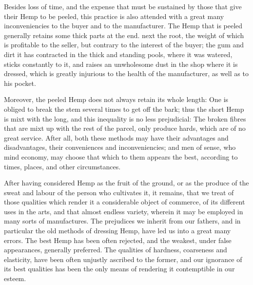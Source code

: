 \documentclass[a4paper, 11pt, oneside, polutonikogreek, english]{article}
\begin{document}
Besides loss of time, and the expense that must be sustained by those that give their Hemp to be peeled, this practice is also attended with a great many inconveniencies to the buyer and to the manufacturer. The Hemp that is peeled generally retains some thick parts at the end. next the root, the weight of which is profitable to the seller, but contrary to the interest of the buyer; the gum and dirt it has contracted in the thick and standing pools, where it was watered, sticks constantly to it, and raises an unwholesome dust in the shop where it is dressed, which is greatly injurious to the health of the manufacturer, as well as to his pocket.

Moreover, the peeled Hemp does not always retain its whole length: One is obliged to break the stem several times to get off the bark; thus the short Hemp is mixt with the long, and this inequality is no less prejudicial: The broken fibres that are mixt up with the rest of the parcel, only produce hards, which are of no great service. After all, both these methods may have their advantages and disadvantages, their conveniences and inconveniencies; and men of sense, who mind economy, may choose that which to them appears the best, according to times, places, and other circumstances.

After having considered Hemp as the fruit of the ground, or as the produce of the sweat and labour of the person who cultivates it, it remains, that we treat of those qualities which render it a considerable object of commerce, of its different uses in the arts, and that almost endless variety, wherein it may be employed in many sorts of manufactures. The prejudices we inherit from our fathers, and in particular the old methods of dressing Hemp, have led us into a great many errors. The best Hemp has been often rejected, and the weakest, under false appearances, generally preferred. The qualities of hardness, coarseness and elasticity, have been often unjustly ascribed to the former, and our ignorance of its best qualities has been the only means of rendering it contemptible in our esteem.
\end{document}
